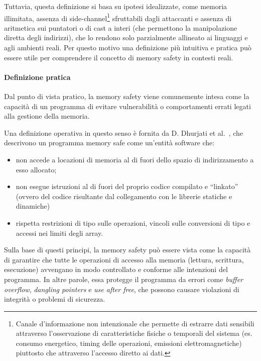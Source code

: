 Tuttavia, questa definizione si basa su ipotesi idealizzate, come memoria
illimitata, assenza di side-channel\footnote{Canale d'informazione non
intenzionale che permette di estrarre dati sensibili attraverso l'osservazione
di caratteristiche fisiche o temporali del sistema (es. consumo energetico, timing
delle operazioni, emissioni elettromagnetiche) piuttosto che attraverso l'accesso
diretto ai dati.} sfruttabili dagli attaccanti e assenza di aritmetica sui
puntatori o di cast a interi (che permettono la manipolazione diretta degli indirizzi),
che lo rendono solo parzialmente allineato ai linguaggi e agli ambienti reali.
Per questo motivo una definizione più intuitiva e pratica può essere utile per
comprendere il concetto di memory safety in contesti reali.

\paragraph{Definizione pratica}

Dal punto di vista pratico, la memory safety viene comunemente intesa come la capacità
di un programma di evitare vulnerabilità o comportamenti errati legati alla gestione
della memoria.

Una definizione operativa in questo senso è fornita da D. Dhurjati et al.~\cite{memory_safety_without_runtime_checks},
che descrivono un programma memory safe come un'entità software che:
\begin{itemize}
  \item non accede a locazioni di memoria al di fuori dello spazio di indirizzamento
    a esso allocato;

  \item non esegue istruzioni al di fuori del proprio codice compilato e ``linkato''
    (ovvero del codice risultante dal collegamento con le librerie statiche e
    dinamiche)

  \item rispetta restrizioni di tipo sulle operazioni, vincoli sulle conversioni
    di tipo e accessi nei limiti degli array.
\end{itemize}

Sulla base di questi principi, la memory safety può essere vista come la capacità
di garantire che tutte le operazioni di accesso alla memoria (lettura, scrittura,
esecuzione) avvengano in modo controllato e conforme alle intenzioni del programma.
In altre parole, essa protegge il programma da errori come \textit{buffer
overflow}, \textit{dangling pointers} e \textit{use after free}, che possono
causare violazioni di integrità o problemi di sicurezza.

